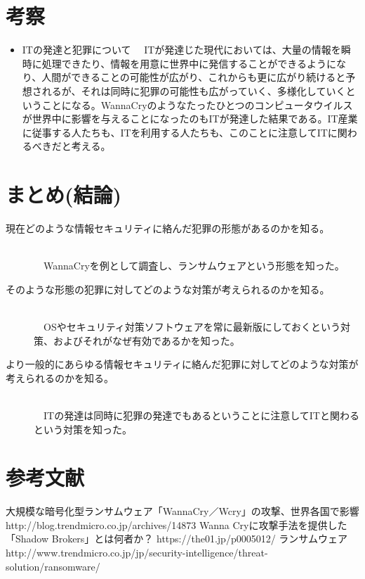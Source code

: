 \documentclass[a4paper,12pt]{jarticle}
\begin{document}
\section{考察}
\begin{itemize}
 \item ITの発達と犯罪について
　ITが発達じた現代においては、大量の情報を瞬時に処理できたり、情報を用意に世界中に発信することができるようになり、人間ができることの可能性が広がり、これからも更に広がり続けると予想されるが、それは同時に犯罪の可能性も広がっていく、多様化していくということになる。WannaCryのようなたったひとつのコンピュータウイルスが世界中に影響を与えることになったのもITが発達した結果である。IT産業に従事する人たちも、ITを利用する人たちも、このことに注意してITに関わるべきだと考える。
\end{itemize}
\newpage
\section{まとめ(結論)}
\begin{description}
 \item[現在どのような情報セキュリティに絡んだ犯罪の形態があるのかを知る。]\mbox\\\\
　WannaCryを例として調査し、ランサムウェアという形態を知った。
 \item[そのような形態の犯罪に対してどのような対策が考えられるのかを知る。]\mbox\\\\
　OSやセキュリティ対策ソフトウェアを常に最新版にしておくという対策、およびそれがなぜ有効であるかを知った。
 \item[より一般的にあらゆる情報セキュリティに絡んだ犯罪に対してどのような対策が考えられるのかを知る。]\mbox\\\\
　ITの発達は同時に犯罪の発達でもあるということに注意してITと関わるという対策を知った。
\end{description}
\section{参考文献}
\begin{thebibliography}{99}
  大規模な暗号化型ランサムウェア「WannaCry／Wcry」の攻撃、世界各国で影響 http://blog.trendmicro.co.jp/archives/14873
  Wanna Cryに攻撃手法を提供した「Shadow Brokers」とは何者か？ https://the01.jp/p0005012/
  ランサムウェア http://www.trendmicro.co.jp/jp/security-intelligence/threat-solution/ransomware/
\end{thebibliography}
\end{document}
